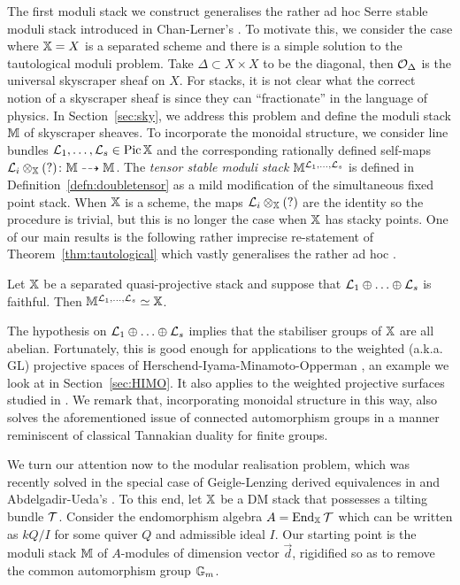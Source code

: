 \documentclass[12pt]{amsart}
\begin{document}
The first moduli stack we construct  generalises the rather ad hoc Serre stable moduli stack introduced in  Chan-Lerner's \cite{CL}. To motivate this, we consider the case where $\mathbb{X}=X$ is a separated scheme and  there is a simple solution to the tautological moduli problem. Take $\Delta \subset X \times X$ to be the diagonal, then $\mathcal{O}_{\Delta}$ is the universal skyscraper sheaf on $X$. For stacks, it is not clear what the correct notion of a skyscraper sheaf is since they can ``fractionate'' in the language of physics. In Section~\ref{sec:sky}, we address this problem and define the moduli stack $\mathbb{M}$ of skyscraper sheaves.
To incorporate the monoidal structure, we consider line bundles $\mathcal{L}_1,\ldots, \mathcal{L}_s \in \operatorname{Pic} \mathbb{X}$ and the corresponding rationally defined self-maps $\mathcal{L}_i \otimes_{\mathbb{X}} (?) \colon \mathbb{M} \dashrightarrow \mathbb{M}$. The {\em tensor stable moduli stack} $\mathbb{M}^{\mathcal{L}_1,\ldots,\mathcal{L}_s}$ is defined in Definition~\ref{defn:doubletensor} as a mild modification of the simultaneous fixed point stack. When $\mathbb{X}$ is a scheme, the maps $\mathcal{L}_i \otimes_{\mathbb{X}} (?)$ are the identity so the procedure is trivial, but this is no longer the case when $\mathbb{X}$ has stacky points. One of our main results is the following rather imprecise re-statement of Theorem~\ref{thm:tautological} which vastly generalises the rather ad hoc \cite[Theorem~9.6]{CL}.
\begin{theorem}
Let $\mathbb{X}$ be a separated quasi-projective stack and suppose that $\mathcal{L}_1\oplus \ldots \oplus \mathcal{L}_s$ is faithful. Then $\mathbb{M}^{\mathcal{L}_1,\ldots,\mathcal{L}_s} \simeq \mathbb{X}$.
\end{theorem}
\noindent The hypothesis on $\mathcal{L}_1\oplus \ldots \oplus\mathcal{L}_s$ implies that the stabiliser groups of $\mathbb{X}$ are all abelian. Fortunately, this is good enough for applications to the weighted (a.k.a. GL) projective spaces of Herschend-Iyama-Minamoto-Opperman \cite{HIMO}, an example we look at in Section~\ref{sec:HIMO}. It also applies to the weighted projective surfaces studied in \cite{C17}. We remark that, incorporating monoidal structure in this way, also solves the aforementioned issue of connected automorphism groups in a manner reminiscent of classical Tannakian duality for finite groups.

We turn our attention now to the modular realisation problem, which was recently solved in the special case of Geigle-Lenzing \cite{GL} derived equivalences in \cite{CL} and Abdelgadir-Ueda's \cite{AU}. To this end, let $\mathbb{X}$ be a DM stack that possesses a tilting bundle $\mathcal{T}$. Consider the endomorphism algebra $A = \operatorname{End}_{\mathbb{X}} \mathcal{T}$ which can be written as $kQ/I$ for some quiver $Q$ and admissible ideal $I$. Our starting point is the moduli stack $\mathbb{M}$ of $A$-modules of dimension vector $\vec{d}$, rigidified so as to remove the common automorphism group $\mathbb{G}_m$. 
\end{document}
